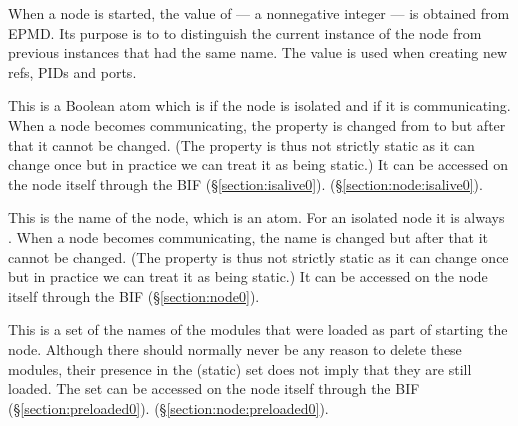 \begin{Lentry}
\item[\T{creation[\Z{N}]}]
When a node is started, the value of  --- a nonnegative integer ---
is obtained from EPMD.  Its purpose is to
to distinguish the current instance of the node from previous instances
that had the same name.  The value is used when creating new refs, PIDs
and ports.

\item[\T{communicating[\Z{N}]}]
This is a Boolean atom which is  if the node is isolated
and  if it is communicating.  When a node becomes communicating, the
property is changed from  to  but after that it cannot be changed.
(The property is
thus not strictly static as it can change once but in practice we can
treat it as being static.)
It can be accessed on the node itself through the BIF
\ifOld {}
(\S\ref{section:isalive0}).\fi
\ifStd {}
(\S\ref{section:node:isalive0}).\fi
{}

\item[\T{name[\Z{N}]}]
This is the name of the node, which is an atom.  For an isolated node it
is always .
When a node becomes communicating, the
name is changed but after that it cannot be changed.  (The property is
thus not strictly static as it can change once but in practice we can
treat it as being static.)
It can be accessed on the node itself through the BIF
 (\S\ref{section:node0}).

\item[\T{preloaded[\Z{N}]}]
This is a set of the names of the modules that were loaded as part of
starting the node.  Although there should normally never be
any reason to delete these modules, their presence in the (static)
set does not imply that
they are still loaded.
The set can be accessed on the node itself through the BIF
\ifOld {}
(\S\ref{section:preloaded0}).\fi
\ifStd {}
(\S\ref{section:node:preloaded0}).\fi
{}
\end{Lentry}


